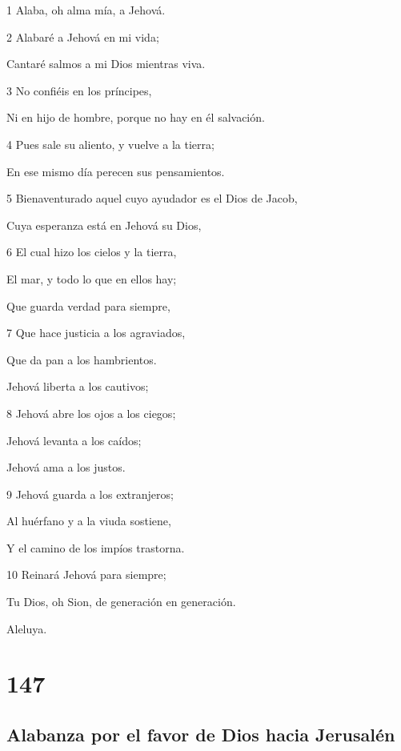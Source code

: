 \par 1 Alaba, oh alma mía, a Jehová.
\par 2 Alabaré a Jehová en mi vida;
\par Cantaré salmos a mi Dios mientras viva.
\par 3 No confiéis en los príncipes,
\par Ni en hijo de hombre, porque no hay en él salvación.
\par 4 Pues sale su aliento, y vuelve a la tierra;
\par En ese mismo día perecen sus pensamientos.
\par 5 Bienaventurado aquel cuyo ayudador es el Dios de Jacob,
\par Cuya esperanza está en Jehová su Dios,
\par 6 El cual hizo los cielos y la tierra,
\par El mar, y todo lo que en ellos hay;
\par Que guarda verdad para siempre,
\par 7 Que hace justicia a los agraviados,
\par Que da pan a los hambrientos.
\par Jehová liberta a los cautivos;
\par 8 Jehová abre los ojos a los ciegos;
\par Jehová levanta a los caídos;
\par Jehová ama a los justos.
\par 9 Jehová guarda a los extranjeros;
\par Al huérfano y a la viuda sostiene,
\par Y el camino de los impíos trastorna.
\par 10 Reinará Jehová para siempre;
\par Tu Dios, oh Sion, de generación en generación.
\par Aleluya.

\chapter{147}

\section*{Alabanza por el favor de Dios hacia Jerusalén}

